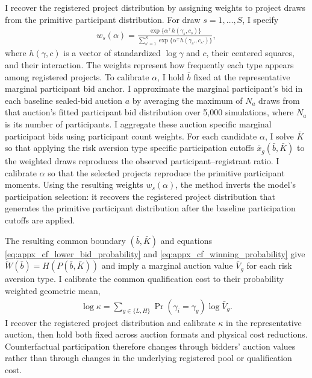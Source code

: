 \documentclass[12pt]{article}
\theoremstyle{definition} %
\begin{document}
I recover the registered project distribution by assigning weights to project draws from the primitive participant distribution. For draw $s = 1,\dots,S$, I specify
\begin{align*}
w_s(\alpha)
=\frac{\exp\{\alpha^\top h(\gamma_s,c_s)\}}
{\sum_{s'=1}^S \exp\{\alpha^\top h(\gamma_{s'},c_{s'})\}},
\end{align*}
where $h(\gamma,c)$ is a vector of standardized $\log\gamma$ and $c$, their centered squares, and their interaction. The weights represent how frequently each type appears among registered projects. To calibrate $\alpha$, I hold $\bar b$ fixed at the representative marginal participant bid anchor. I approximate the marginal participant's bid in each baseline sealed-bid auction $a$ by averaging the maximum of $N_a$ draws from that auction's fitted participant bid distribution over 5,000 simulations, where $N_a$ is its number of participants. I aggregate these auction specific marginal participant bids using participant count weights. For each candidate $\alpha$, I solve $\bar K$ so that applying the risk aversion type specific participation cutoffs $\bar x_g(\bar b,\bar K)$ to the weighted draws reproduces the observed participant--registrant ratio. I calibrate $\alpha$ so that the selected projects reproduce the primitive participant moments. Using the resulting weights $w_s(\alpha)$, the method inverts the model's participation selection: it recovers the registered project distribution that generates the primitive participant distribution after the baseline participation cutoffs are applied.

The resulting common boundary $(\bar b,\bar K)$ and equations \eqref{eq:appx_cf_lower_bid_probability} and \eqref{eq:appx_cf_winning_probability} give $\widetilde W(\bar b)=H(P(\bar b,\bar K))$ and imply a marginal auction value $\bar V_g$ for each risk aversion type. I calibrate the common qualification cost to their probability weighted geometric mean,
\begin{align}
\log\kappa=\sum_{g\in\{L,H\}}\Pr(\gamma_i=\gamma_g)\log \bar V_g.
\label{eq:appx_cf_kappa}
\end{align}
I recover the registered project distribution and calibrate $\kappa$ in the representative auction, then hold both fixed across auction formats and physical cost reductions. Counterfactual participation therefore changes through bidders' auction values rather than through changes in the underlying registered pool or qualification cost.
\end{document}
